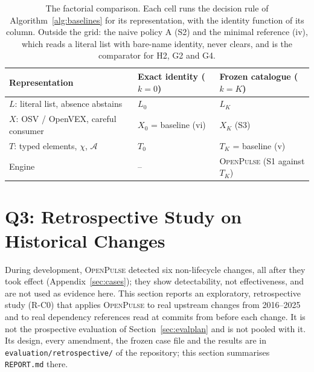 \documentclass[11pt,a4paper]{article}
\newcommand{\op}{\textsc{OpenPulse}}
\newcommand{\code}[1]{\texttt{#1}}
\begin{document}
\begin{table}[t]
\centering
\footnotesize
\begin{tabularx}{\linewidth}{@{}l X X@{}}
\toprule
Representation & Exact identity ($k=0$) & Frozen catalogue ($k=K$) \\
\midrule
$L$: literal list, absence abstains & $L_0$ & $L_K$ \\
$X$: OSV / OpenVEX, careful consumer & $X_0$ = baseline (vi) &
  $X_K$ (S3) \\
$T$: typed elements, $\chi$, $\mathcal{A}$ & $T_0$ & $T_K$ = baseline
  (v) \\
\midrule
Engine & -- & \op{} (S1 against $T_K$) \\
\bottomrule
\end{tabularx}
\caption{The factorial comparison. Each cell runs the decision rule of
Algorithm~\ref{alg:baselines} for its representation, with the
identity function of its column. Outside the grid: the naive policy A
(S2) and the minimal reference (iv), which reads a literal list with
bare-name identity, never clears, and is the comparator for H2, G2 and
G4.}
\label{tab:factorial}
\end{table}

\section{Q3: Retrospective Study on Historical Changes}
\label{sec:retro}

During development, \op{} detected six non-lifecycle changes, all
after they took effect (Appendix~\ref{sec:cases}); they show
detectability, not effectiveness, and are not used as evidence here.
This section reports an exploratory, retrospective study (R-C0) that
applies \op{} to real upstream changes from 2016--2025 and to real
dependency references read at commits from before each change. It is
not the prospective evaluation of Section~\ref{sec:evalplan} and is not
pooled with it. Its design, every amendment,
the frozen case file and the results are in
\code{evaluation/retrospective/} of the repository; this section
summarises \code{REPORT.md} there.
\end{document}
